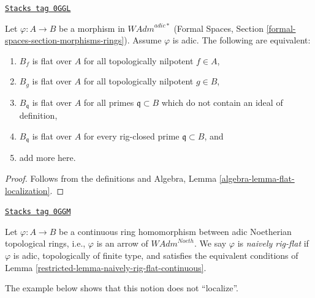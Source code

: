 \begin{lemma}
\label{restricted-lemma-naively-rig-flat-continuous}
\href{https://stacks.math.columbia.edu/tag/0GGL}{\texttt{Stacks tag 0GGL}}

Let $\varphi : A \to B$ be a morphism in $\textit{WAdm}^{adic*}$
(Formal Spaces, Section \ref{formal-spaces-section-morphisms-rings}).
Assume $\varphi$ is adic. The following are equivalent:
\begin{enumerate}
\item $B_f$ is flat over $A$ for all
topologically nilpotent $f \in A$,
\item $B_g$ is flat over $A$ for all
topologically nilpotent $g \in B$,
\item $B_\mathfrak q$ is flat over $A$
for all primes $\mathfrak q \subset B$ which do not contain
an ideal of definition,
\item $B_\mathfrak q$ is flat over $A$ for every rig-closed
prime $\mathfrak q \subset B$, and
\item add more here.
\end{enumerate}
\end{lemma}

\begin{proof}
Follows from the definitions and
Algebra, Lemma \ref{algebra-lemma-flat-localization}.
\end{proof}

\begin{definition}
\label{restricted-definition-naively-rig-flat}
\href{https://stacks.math.columbia.edu/tag/0GGM}{\texttt{Stacks tag 0GGM}}

Let $\varphi : A \to B$ be a continuous ring homomorphism
between adic Noetherian topological rings, i.e., $\varphi$
is an arrow of $\textit{WAdm}^{Noeth}$. We say $\varphi$ is
{\it naively rig-flat} if $\varphi$ is adic, topologically
of finite type, and satisfies the equivalent conditions of
Lemma \ref{restricted-lemma-naively-rig-flat-continuous}.
\end{definition}

The example below shows that this notion does not ``localize''.

